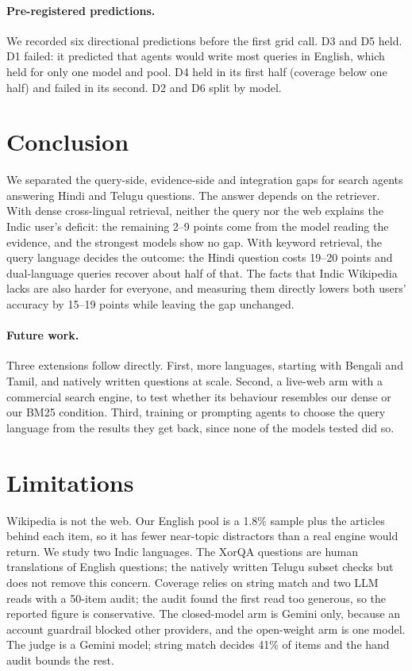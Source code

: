 \paragraph{Pre-registered predictions.} We recorded six directional predictions before the first grid call. D3 and D5 held. D1 failed: it predicted that agents would write most queries in English, which held for only one model and pool. D4 held in its first half (coverage below one half) and failed in its second. D2 and D6 split by model.

\section{Conclusion}
\label{sec:conclusion}
We separated the query-side, evidence-side and integration gaps for search agents answering Hindi and Telugu questions. The answer depends on the retriever. With dense cross-lingual retrieval, neither the query nor the web explains the Indic user's deficit: the remaining 2--9 points come from the model reading the evidence, and the strongest models show no gap. With keyword retrieval, the query language decides the outcome: the Hindi question costs 19--20 points and dual-language queries recover about half of that. The facts that Indic Wikipedia lacks are also harder for everyone, and measuring them directly lowers both users' accuracy by 15--19 points while leaving the gap unchanged.

\paragraph{Future work.} Three extensions follow directly. First, more languages, starting with Bengali and Tamil, and natively written questions at scale. Second, a live-web arm with a commercial search engine, to test whether its behaviour resembles our dense or our BM25 condition. Third, training or prompting agents to choose the query language from the results they get back, since none of the models tested did so.

\section*{Limitations}
\label{sec:limits}
Wikipedia is not the web. Our English pool is a 1.8\% sample plus the articles behind each item, so it has fewer near-topic distractors than a real engine would return. We study two Indic languages. The XorQA questions are human translations of English questions; the natively written Telugu subset checks but does not remove this concern. Coverage relies on string match and two LLM reads with a 50-item audit; the audit found the first read too generous, so the reported figure is conservative. The closed-model arm is Gemini only, because an account guardrail blocked other providers, and the open-weight arm is one model. The judge is a Gemini model; string match decides 41\% of items and the hand audit bounds the rest.

